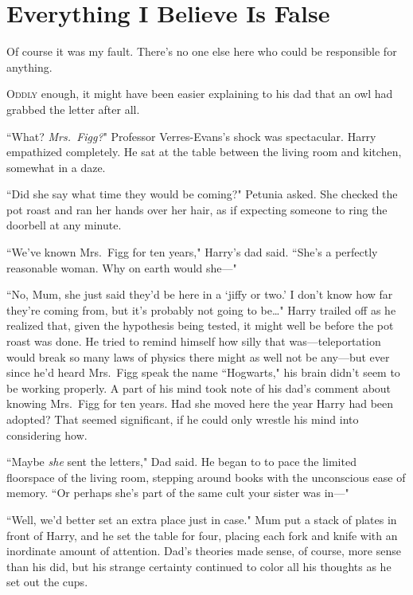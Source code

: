 \chapter{Everything I Believe Is False}

\begin{chapterOpeningQuote}
Of course it was my fault. There's no one else here who could be responsible for anything.
\end{chapterOpeningQuote}

\lettrine{O}{ddly} enough, it might have been easier explaining to his dad that an owl had grabbed the letter after all.

``What? \emph{Mrs.~Figg?}" Professor Verres-Evans's shock was spectacular. Harry empathized completely. He sat at the table between the living room and kitchen, somewhat in a daze.

``Did she say what time they would be coming?" Petunia asked. She checked the pot roast and ran her hands over her hair, as if expecting someone to ring the doorbell at any minute.

``We've known Mrs.~Figg for ten years," Harry's dad said. ``She's a perfectly reasonable woman. Why on earth would she---"

``No, Mum, she just said they'd be here in a `jiffy or two.' I don't know how far they're coming from, but it's probably not going to be{\ldots}" Harry trailed off as he realized that, given the hypothesis being tested, it might well be before the pot roast was done. He tried to remind himself how silly that was---teleportation would break so many laws of physics there might as well not be any---but ever since he'd heard Mrs.~Figg speak the name ``Hogwarts," his brain didn't seem to be working properly. A part of his mind took note of his dad's comment about knowing Mrs.~Figg for ten years. Had she moved here the year Harry had been adopted? That seemed significant, if he could only wrestle his mind into considering how.

``Maybe \emph{she} sent the letters," Dad said. He began to to pace the limited floorspace of the living room, stepping around books with the unconscious ease of memory. ``Or perhaps she's part of the same cult your sister was in---"

``Well, we'd better set an extra place just in case." Mum put a stack of plates in front of Harry, and he set the table for four, placing each fork and knife with an inordinate amount of attention. Dad's theories made sense, of course, more sense than his did, but his strange certainty continued to color all his thoughts as he set out the cups.

